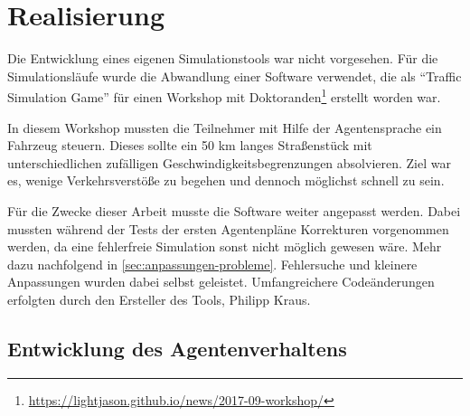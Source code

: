\section{Realisierung}
\label{sec:realisierung}

Die Entwicklung eines eigenen Simulationstools war nicht vorgesehen.
Für die Simulationsläufe wurde die Abwandlung einer Software verwendet, die als \enquote{Traffic Simulation Game} für einen Workshop mit Doktoranden\footnote{\url{https://lightjason.github.io/news/2017-09-workshop/}} erstellt worden war.

In diesem Workshop mussten die Teilnehmer mit Hilfe der Agentensprache ein Fahrzeug steuern. Dieses sollte ein 50 km langes Straßenstück mit unterschiedlichen zufälligen Geschwindigkeitsbegrenzungen absolvieren. Ziel war es, wenige Verkehrsverstöße zu begehen und dennoch möglichst schnell zu sein.

Für die Zwecke dieser Arbeit musste die Software weiter angepasst werden.
Dabei mussten während der Tests der ersten Agentenpläne Korrekturen vorgenommen werden, da eine fehlerfreie Simulation sonst nicht möglich gewesen wäre. 
Mehr dazu nachfolgend in \cref{sec:anpassungen-probleme}.
Fehlersuche und kleinere Anpassungen wurden dabei selbst geleistet.
Umfangreichere Codeänderungen erfolgten durch den Ersteller des Tools, Philipp Kraus.




\subsection{Entwicklung des Agentenverhaltens}%
\label{sec:entwicklung-agentenplan}

